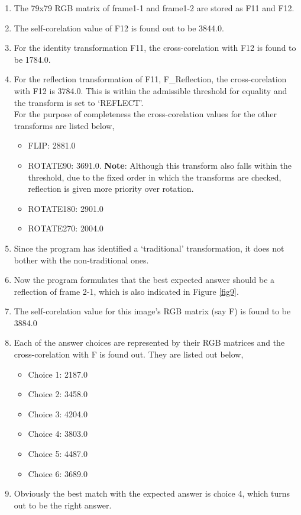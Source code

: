 \documentclass[10pt, letter]{article}
\begin{document}
\begin{enumerate}
	\item The 79x79 RGB matrix of frame1-1 and frame1-2 are stored as F11 and F12.
	\item The self-corelation value of F12 is found out to be 3844.0.
	\item For the identity transformation F11, the cross-corelation with F12 is found to be 1784.0.
	\item For the reflection transformation of F11, F\_Reflection, the cross-corelation with F12 is 3784.0. This is within the admissible threshold for equality and the transform is set to `REFLECT'.\\
	For the purpose of completeness the cross-corelation values for the other transforms are listed below,
	\begin{itemize}
		\item FLIP: 2881.0
		\item ROTATE90: 3691.0. \textbf{Note}: Although this transform also falls within the threshold, due to the fixed order in which the transforms are checked, reflection is given more priority over rotation.
		\item ROTATE180: 2901.0
		\item ROTATE270: 2004.0
	\end{itemize}
	\item Since the program has identified a `traditional' transformation, it does not bother with the non-traditional ones.
	\item Now the program formulates that the best expected answer should be a reflection of frame 2-1, which is also indicated in Figure \ref{fig9}.
	\item The self-corelation value for this image's RGB matrix (say F) is found to be 3884.0
	\item Each of the answer choices are represented by their RGB matrices and the cross-corelation with F is found out. They are listed out below,
		\begin{itemize}
			\item Choice 1: 2187.0
			\item Choice 2: 3458.0
			\item Choice 3: 4204.0
			\item Choice 4: 3803.0
			\item Choice 5: 4487.0
			\item Choice 6: 3689.0
		\end{itemize}
	\item Obviously the best match with the expected answer is choice 4, which turns out to be the right answer.
\end{enumerate}
\end{document}
